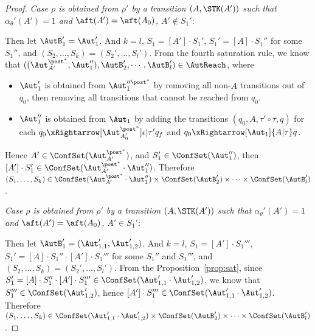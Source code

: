 \begin{proof}
\noindent \emph{Case $\rho$ is obtained from $\rho'$ by a transition $(A,\STK(A'))$ such that $\alpha_\theta'(A')=1$ and $\aft(A')=\aft(A_0)$, $A'\notin S_1'$}: 

Then let $\AutB_1'=\Aut_1'$. And $k=l$, $S_1=[A']\cdot S_1'$, $S_1'=[A]\cdot S_1''$ for some $S_1''$, and $(S_2,\dots,S_k)=(S_2',\dots,S_l')$.
From the fourth saturation rule, we know that $((\Aut_{A'}^{\post^*},\Aut_{1}''),\AutB_2',\cdots,\AutB_l')\in\AutReach$, where
\begin{itemize}
    \item $\Aut_1'$ is obtained from $\Aut_1''^{\post^*}$ by removing all non-$A$ transitions out of $q_0$, then removing all transitions that cannot be reached from $q_0$.
    \item $\Aut_1''$ is obtained from $\Aut_1$ by adding the transitions $(q_0,A,\tau'\circ\tau,q)$ for each $q_0\xRightarrow[\Aut_{A_0'}^{\post^*}]{\epsilon | \tau'} q_f$ and $q_0\xRightarrow[\Aut_1]{A | \tau} q$.
\end{itemize}
Hence $A'\in\ConfSet(\Aut_{A'}^{\post^*})$, and $S_1'\in\ConfSet(\Aut_{1}'')$, then $[A']\cdot S_1'\in \ConfSet(\Aut_{A'}^{\post^*}\cdot\Aut_{1}'')$.
Therefore $(S_1,\dots,S_k)\in\ConfSet(\Aut_{A'}^{\post^*}\cdot\Aut_1'')\times\ConfSet(\AutB_2')\times\cdots\times\ConfSet(\AutB_l')$.

\noindent \emph{Case $\rho$ is obtained from $\rho'$ by a transition $(A,\STK(A'))$ such that $\alpha_\theta'(A')=1$ and $\aft(A')=\aft(A_0)$, $A'\in S_1'$}: 

Then let $\AutB_1'=(\Aut_{1,1}',\Aut_{1,2}')$. And $k=l$, $S_1=[A']\cdot S_1'''$, $S_1'=[A]\cdot S_1''\cdot [A']\cdot S_1'''$ for some $S_1''$ and $S_1'''$, and $(S_2,\dots,S_k)=(S_2',\dots,S_l')$.
From the Proposition~\ref{prop:sat}, since $S_1'=[A]\cdot S_1''\cdot [A']\cdot S_1'''\in\ConfSet(\Aut_{1,1}'\cdot\Aut_{1,2}')$, 
we know that $S_1'''\in\ConfSet(\Aut_{1,2}')$, hence $[A']\cdot S_1'''\in\ConfSet(\Aut_{1,1}'\cdot\Aut_{1,2}')$.
Therefore $(S_1,\dots,S_k)\in\ConfSet(\Aut_{1,1}'\cdot\Aut_{1,2}')\times\ConfSet(\AutB_2')\times\cdots\times\ConfSet(\AutB_l')$.


\end{proof}

